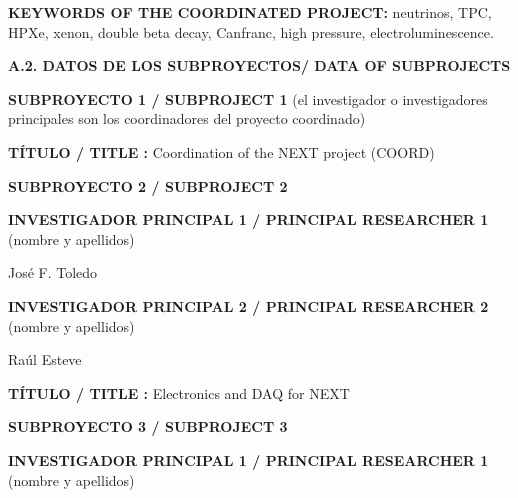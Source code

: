 \documentclass[a4paper,11pt,oneside]{article}
\begin{document}
\noindent\textbf{KEYWORDS OF THE COORDINATED PROJECT:} neutrinos, TPC, HPXe, xenon, double beta decay, Canfranc, high pressure, electroluminescence. 

 \vspace{12pt}


\noindent\textbf{A.2. DATOS DE LOS SUBPROYECTOS/ DATA OF SUBPROJECTS }
 \vspace{12pt}
 
\noindent\textbf{SUBPROYECTO 1 / SUBPROJECT 1} (el investigador o investigadores principales son los coordinadores del proyecto coordinado)

\vspace{6pt}
\noindent\textbf{TÍTULO / TITLE :} Coordination of the NEXT project (COORD)
%

 \vspace{12pt}
 
\noindent\textbf{SUBPROYECTO 2 / SUBPROJECT 2}
\vspace{6pt}

\noindent\textbf{INVESTIGADOR PRINCIPAL 1 / PRINCIPAL RESEARCHER 1 } (nombre y apellidos)

\vspace{6pt}
\noindent Jos\'e F. Toledo

\vspace{12pt}
\noindent\textbf{INVESTIGADOR PRINCIPAL 2 / PRINCIPAL RESEARCHER 2} (nombre y apellidos)

\vspace{6pt}
\noindent Ra\'ul Esteve

\vspace{6pt}
\noindent\textbf{TÍTULO / TITLE :} Electronics and DAQ for NEXT

\vspace{12pt}
\noindent\textbf{SUBPROYECTO 3 / SUBPROJECT 3}
\vspace{6pt}

\noindent\textbf{INVESTIGADOR PRINCIPAL 1 / PRINCIPAL RESEARCHER 1 } (nombre y apellidos)
\end{document}
